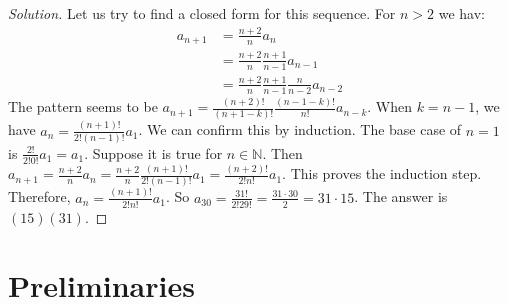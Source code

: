 \documentclass[crop=false,class=book,oneside]{standalone}
\begin{document}
        \begin{proof}[Solution]
            Let us try to find a closed form for this sequence. For $n>2$ we hav:
            \begin{align*}
                a_{n+1} &= \frac{n+2}{n}a_n \\
                &= \frac{n+2}{n}\frac{n+1}{n-1}a_{n-1}\\
                &= \frac{n+2}{n}\frac{n+1}{n-1}\frac{n}{n-2}a_{n-2}
            \end{align*}
            The pattern seems to be $a_{n+1} = \frac{(n+2)!}{(n+1-k)!}\frac{(n-1-k)!}{n!}a_{n-k}$. When $k=n-1$, we have $a_{n} = \frac{(n+1)!}{2!(n-1)!}a_1$. We can confirm this by induction. The base case of $n=1$ is $\frac{2!}{2!0!}a_1 = a_1$. Suppose it is true for $n\in \mathbb{N}$. Then $a_{n+1} = \frac{n+2}{n} a_n = \frac{n+2}{n} \frac{(n+1)!}{2!(n-1)!}a_1 = \frac{(n+2)!}{2!n!}a_1$. This proves the induction step. Therefore, $a_n = \frac{(n+1)!}{2!n!}a_1$. So $a_{30} = \frac{31!}{2!29!} = \frac{31\cdot 30}{2} = 31\cdot 15$. The answer is $(15)(31)$.
            \end{proof}
    \section{Preliminaries}
\end{document}
